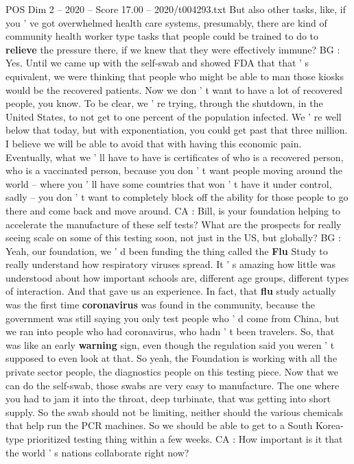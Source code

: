 \begin{textsample}{POS Dim 2 – 2020 – Score 17.00 – 2020/t004293.txt}
But also other tasks, like, if you ' ve got overwhelmed health care systems, presumably, there are kind of community health worker type tasks that people could be trained to do to \textbf{relieve} the pressure there, if we knew that they were effectively immune?
BG : Yes.
Until we came up with the self-swab and showed FDA that that ' s equivalent, we were thinking that people who might be able to man those kiosks would be the recovered patients.
Now we don ' t want to have a lot of recovered people, you know.
To be clear, we ' re trying, through the shutdown, in the United States, to not get to one percent of the population infected.
We ' re well below that today, but with exponentiation, you could get past that three million.
I believe we will be able to avoid that with having this economic pain.
Eventually, what we ' ll have to have is certificates of who is a recovered person, who is a vaccinated person, because you don ' t want people moving around the world -- where you ' ll have some countries that won ' t have it under control, sadly -- you don ' t want to completely block off the ability for those people to go there and come back and move around.
CA : Bill, is your foundation helping to accelerate the manufacture of these self tests?
What are the prospects for really seeing scale on some of this testing soon, not just in the US, but globally?
BG : Yeah, our foundation, we ' d been funding the thing called the \textbf{Flu} Study to really understand how respiratory viruses spread.
It ' s amazing how little was understood about how important schools are, different age groups, different types of interaction.
And that gave us an experience.
In fact, that \textbf{flu} study actually was the first time \textbf{coronavirus} was found in the community, because the government was still saying you only test people who ' d come from China, but we ran into people who had coronavirus, who hadn ' t been travelers.
So, that was like an early \textbf{warning} sign, even though the regulation said you weren ' t supposed to even look at that.
So yeah, the Foundation is working with all the private sector people, the diagnostics people on this testing piece.
Now that we can do the self-swab, those swabs are very easy to manufacture.
The one where you had to jam it into the throat, deep turbinate, that was getting into short supply.
So the swab should not be limiting, neither should the various chemicals that help run the PCR machines.
So we should be able to get to a South Korea-type prioritized testing thing within a few weeks.
CA : How important is it that the world ' s nations collaborate right now?

\end{textsample}
